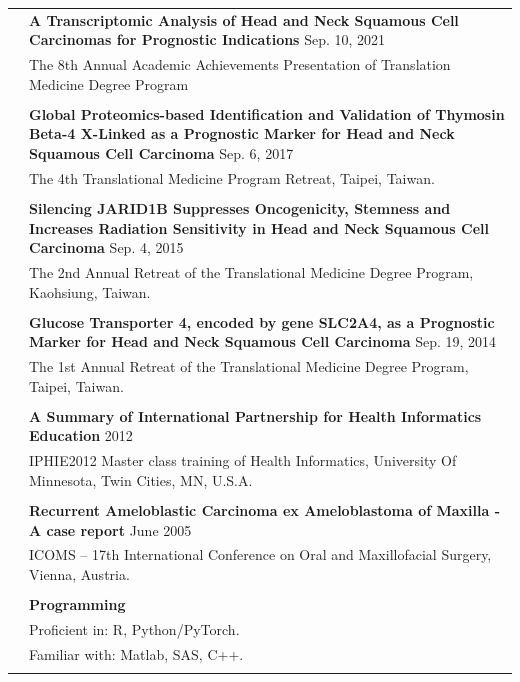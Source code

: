\documentclass[letterpaper, 11pt]{article}
\begin{document}
\begin{longtable}{p{1.3in}p{4.8in}}
{\color{OliveGreen}{Presentation}} 
& \textbf{A Transcriptomic Analysis of Head and Neck Squamous Cell Carcinomas for Prognostic Indications} \hfill Sep. 10, 2021 \\
& The 8th Annual Academic Achievements Presentation of Translation Medicine Degree Program \\
& \\

& \textbf{Global Proteomics-based Identification
and Validation of Thymosin Beta-4 X-Linked as a Prognostic Marker for Head
and Neck Squamous Cell Carcinoma} \hfill Sep. 6, 2017 \\
& The 4th Translational Medicine
Program Retreat, Taipei, Taiwan. \\
& \\

& \textbf{Silencing JARID1B Suppresses
Oncogenicity, Stemness and Increases Radiation Sensitivity in Head and
Neck Squamous Cell Carcinoma} \hfill Sep. 4, 2015 \\
& The 2nd Annual Retreat of the
Translational Medicine Degree Program, Kaohsiung, Taiwan. \\
& \\


& \textbf{Glucose Transporter 4, encoded by gene
SLC2A4, as a Prognostic Marker for Head and Neck Squamous Cell
Carcinoma} \hfill Sep. 19, 2014 \\
& The 1st Annual Retreat of the Translational Medicine Degree Program, Taipei, Taiwan. \\
& \\


& \textbf{A Summary of International Partnership for Health Informatics Education} \hfill  2012 \\
& IPHIE2012 Master
class training of Health Informatics, University Of Minnesota, Twin
Cities, MN, U.S.A. \\
& \\

& \textbf{Recurrent Ameloblastic Carcinoma ex
Ameloblastoma of Maxilla - A case report} \hfill June 2005 \\
& ICOMS – 17th International
Conference on Oral and Maxillofacial Surgery, Vienna, Austria. \\
& \\




{\color{OliveGreen}{Skills}} 
& \textbf{Programming}\\
& Proficient in: R, Python/PyTorch. \\
& Familiar with: Matlab, SAS, C++. \\
& \\


\end{longtable}
\end{document}
